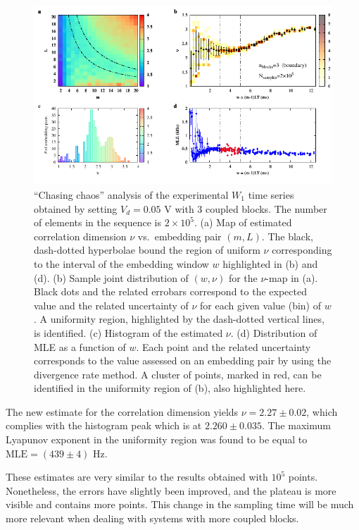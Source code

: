 \begin{figure}[!htbp]
    \centering
    \includegraphics[width=\linewidth]{../blocks/3_blocks/edge/2e5_points/plots/chaos_low.pdf}
    \caption{``Chasing chaos'' analysis of the experimental $W_1$ time series obtained by setting $V_d=0.05$ V with 3 coupled blocks.
    The number of elements in the sequence is $2\times10^5$.
    (a) Map of estimated correlation dimension $\nu$ vs.\ embedding pair $(m, L)$.
    The black, dash-dotted hyperbolae bound the region of uniform $\nu$ corresponding to the interval of the
    embedding window $w$ highlighted in (b) and (d).
    (b) Sample joint distribution of $(w,\nu)$ for the $\nu$-map in (a).
    Black dots and the related errobars correspond to the expected value and the related uncertainty of $\nu$
    for each given value (bin) of $w$. A uniformity region, highlighted by the dash-dotted vertical lines,
    is identified. (c) Histogram of the estimated $\nu$. (d) Distribution of MLE as a function of $w$. Each point and the related
    uncertainty corresponds to the value assessed on an embedding pair by using the divergence rate method.
    A cluster of points, marked in red, can be identified in the uniformity region of (b), also highlighted here.
    }\label{fig:3 blocks chaos boundary 2e5}
\end{figure}

The new estimate for the correlation dimension yields $\nu=2.27\pm0.02$, which complies with the
histogram peak which is at $2.260\pm0.035$. The maximum Lyapunov exponent in the uniformity region was found 
to be equal to $\text{MLE}=(439\pm4)$ Hz.

These estimates are very similar to the results obtained with $10^5$ points.
Nonetheless, the errors have slightly been improved, and the plateau is more visible and contains
more points. This change in the sampling time will be much more relevant when dealing with systems
with more coupled blocks.


